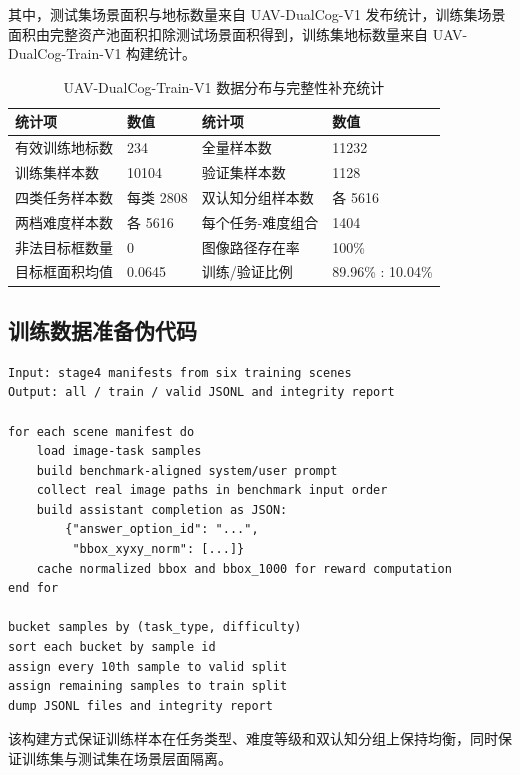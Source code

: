 \begin{thesisappendix}
其中，测试集场景面积与地标数量来自 UAV-DualCog-V1 发布统计，训练集场景面积由完整资产池面积扣除测试场景面积得到，训练集地标数量来自 UAV-DualCog-Train-V1 构建统计。

\begin{table}[htbp]
    \centering
    \caption{UAV-DualCog-Train-V1 数据分布与完整性补充统计}
    \label{tab:app-train-stat}
    \footnotesize
    \setlength{\tabcolsep}{4pt}
    \begin{tabularx}{\textwidth}{@{}U{4.1cm}U{2.2cm}U{4.1cm}U{2.2cm}@{}}
        \toprule
        统计项 & 数值 & 统计项 & 数值 \\
        \midrule
        有效训练地标数 & 234 & 全量样本数 & 11232 \\
        训练集样本数 & 10104 & 验证集样本数 & 1128 \\
        四类任务样本数 & 每类 2808 & 双认知分组样本数 & 各 5616 \\
        两档难度样本数 & 各 5616 & 每个任务-难度组合 & 1404 \\
        非法目标框数量 & 0 & 图像路径存在率 & 100\% \\
        目标框面积均值 & 0.0645 & 训练/验证比例 & 89.96\% : 10.04\% \\
        \bottomrule
    \end{tabularx}
\end{table}

\subsection{训练数据准备伪代码}

\begin{verbatim}
Input: stage4 manifests from six training scenes
Output: all / train / valid JSONL and integrity report

for each scene manifest do
    load image-task samples
    build benchmark-aligned system/user prompt
    collect real image paths in benchmark input order
    build assistant completion as JSON:
        {"answer_option_id": "...",
         "bbox_xyxy_norm": [...]}
    cache normalized bbox and bbox_1000 for reward computation
end for

bucket samples by (task_type, difficulty)
sort each bucket by sample id
assign every 10th sample to valid split
assign remaining samples to train split
dump JSONL files and integrity report
\end{verbatim}

该构建方式保证训练样本在任务类型、难度等级和双认知分组上保持均衡，同时保证训练集与测试集在场景层面隔离。

\end{thesisappendix}
